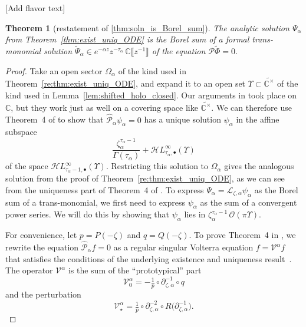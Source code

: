\documentclass{article}
\newcommand{\singexp}[2]{\mathcal{H}L^\infty_{#1, #2}}
\newcommand{\singexpalg}[1]{\singexp{#1}{\bullet}}
\newcommand{\C}{\mathbb{C}}
\newcommand{\volterra}{\mathcal{V}}
\newcommand{\hardpart}{\mathcal{V}_0}
\newcommand{\softpart}{\mathcal{V}_\star}
\newcommand{\solwhole}{f}
\newcommand{\series}[1]{\tilde{#1}}
\newcommand{\laplace}{\mathcal{L}}
\theoremstyle{definition}
\theoremstyle{plain}
\newtheorem{theorem}{Theorem}[section]
\newenvironment{todo}{\color{Coral}}{\color{black}}
\begin{document}
\begin{todo}[Add flavor text]\end{todo}
\begin{theorem}[restatement of \ref{thm:soln_is_Borel_sum}]\label{re:thm:soln_is_Borel_sum}
The analytic solution $\Psi_\alpha$ from Theorem~\ref{thm:exist_uniq_ODE} is the Borel sum of a formal trans-monomial solution $\series{\Psi}_\alpha \in e^{-\alpha z} z^{-\tau_\alpha}\,\C \llbracket z^{-1} \rrbracket$ of the equation $\mathcal{P}\series{\Phi} = 0$.
\end{theorem}
\begin{proof}
Take an open sector $\Omega_\alpha$ of the kind used in Theorem~\ref{re:thm:exist_uniq_ODE}, and expand it to an open set $\Upsilon \subset \widetilde{\C^\times}$ of the kind used in Lemma~\ref{lem:shifted_holo_closed}. Our arguments in \cite{reg-sing-volterra} took place on $\C$, but they work just as well on a covering space like $\widetilde{\C^\times}$. We can therefore use Theorem~4 of \cite{reg-sing-volterra} to show that $\hat{\mathcal{P}}_\alpha \psi_\alpha = 0$ has a unique solution $\psi_\alpha$ in the affine subspace 
\[ \frac{\zeta_\alpha^{\tau_\alpha-1}}{\Gamma(\tau_\alpha)} + \singexpalg{\tau_\alpha}(\Upsilon) \]
of the space $\singexpalg{\tau_\alpha-1}(\Upsilon)$. Restricting this solution to $\Omega_\alpha$ gives the analogous solution from the proof of Theorem~\ref{re:thm:exist_uniq_ODE}, as we can see from the uniqueness part of Theorem~4 of \cite{reg-sing-volterra}. To express $\Psi_\alpha = \laplace_{\zeta, \alpha} \psi_\alpha$ as the Borel sum of a trans-monomial, we first need to express $\psi_\alpha$ as the sum of a convergent power series. We will do this by showing that $\psi_\alpha$ lies in $\zeta_\alpha^{\tau_\alpha - 1}\,\mathcal{O}(\pi \Upsilon)$.

For convenience, let $p = P(-\zeta)$ and $q = Q(-\zeta)$. To prove Theorem~4 in \cite{reg-sing-volterra}, we rewrite the equation $\hat{\mathcal{P}}_\alpha \solwhole = 0$ as a regular singular Volterra equation $\solwhole = \volterra^\alpha \solwhole$ that satisfies the conditions of the underlying existence and uniqueness result~\cite[Theorem~3]{reg-sing-volterra}. The operator $\volterra^\alpha$ is the sum of the ``prototypical'' part
\[ \hardpart^\alpha = -\tfrac{1}{p} \circ \partial^{-1}_{\zeta, \alpha} \circ q \]
and the perturbation
\[ \softpart^\alpha = \tfrac{1}{p} \circ \partial^{-2}_{\zeta, \alpha} \circ R\big(\partial^{-1}_{\zeta, \alpha}\big). \]


\end{proof}
\end{document}
